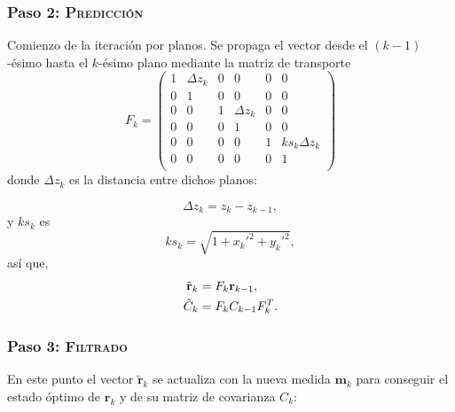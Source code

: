 \documentclass[a4paper]{article}
\let\vec\mathbf  %
\begin{document}
\subsubsection{Paso 2: \textsc{Predicción}}

Comienzo de la iteración por planos. Se propaga el vector desde el $(k - 1)$-ésimo hasta el $k$-ésimo plano mediante la matriz de transporte
\begin{equation}
F_k = 
\left(
\begin{matrix}
1 & \Delta z_k & 0 & 0    & 0 & 0    \\
0 & 1    & 0 & 0    & 0 & 0     \\
0 & 0    & 1 & \Delta z_k & 0 & 0      \\
0 & 0    & 0 & 1    & 0 & 0       \\
0 & 0    & 0 & 0    & 1 & ks_k \Delta z_k\\
0 & 0    & 0 & 0    & 0 & 1         \\
\end{matrix}\right)
\end{equation}
donde $\Delta z_k$ es la distancia entre dichos planos:

\begin{equation}
\Delta z_k = z_k - z_{k-1},
\label{eq:dz}
\end{equation}
y $ks_k$ es
\begin{equation}
ks_k = \sqrt{1 + x_k'^2 + y_k'^2},
\label{eq:ks}
\end{equation}
así que,
\begin{align}
\notag
\tilde{\vec{r}}_k &= F_k \vec{r}_{k-1},\\
\tilde{C}_k &= F_k C_{k-1} F_k^T.
\label{eq:pred}
\end{align}

\subsubsection{Paso 3: \textsc{Filtrado}}

En este punto el vector $\tilde{\vec{r}}_k$  se actualiza con la nueva medida $\vec{m}_k$ para conseguir el estado óptimo de $\vec{r}_k$ y de su matriz de covarianza $C_k$:
\end{document}

